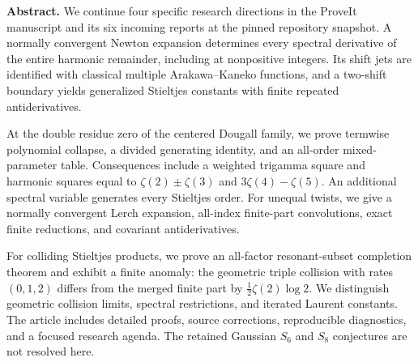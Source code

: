\textbf{Abstract.}
We continue four specific research directions in the ProveIt manuscript
and its six incoming reports at the pinned repository snapshot.
A normally convergent Newton expansion determines every spectral
derivative of the entire harmonic remainder, including at nonpositive
integers. Its shift jets are identified with classical multiple
Arakawa--Kaneko functions, and a two-shift boundary yields generalized
Stieltjes constants with finite repeated antiderivatives.

At the double residue zero of the centered Dougall family, we prove
termwise polynomial collapse, a divided generating identity, and an
all-order mixed-parameter table. Consequences include a weighted
trigamma square and harmonic squares equal to
$\zeta(2)\pm\zeta(3)$ and $3\zeta(4)-\zeta(5)$.
An additional spectral variable generates every Stieltjes order.
For unequal twists, we give a normally convergent Lerch expansion,
all-index finite-part convolutions, exact finite reductions, and
covariant antiderivatives.

For colliding Stieltjes products, we prove an all-factor
resonant-subset completion theorem and exhibit a finite anomaly:
the geometric triple collision with rates $(0,1,2)$ differs from
the merged finite part by $\tfrac12\zeta(2)\log2$.
We distinguish geometric collision limits, spectral restrictions,
and iterated Laurent constants. The article includes detailed
proofs, source corrections, reproducible diagnostics, and a focused
research agenda. The retained Gaussian $S_6$ and $S_8$ conjectures
are not resolved here.
